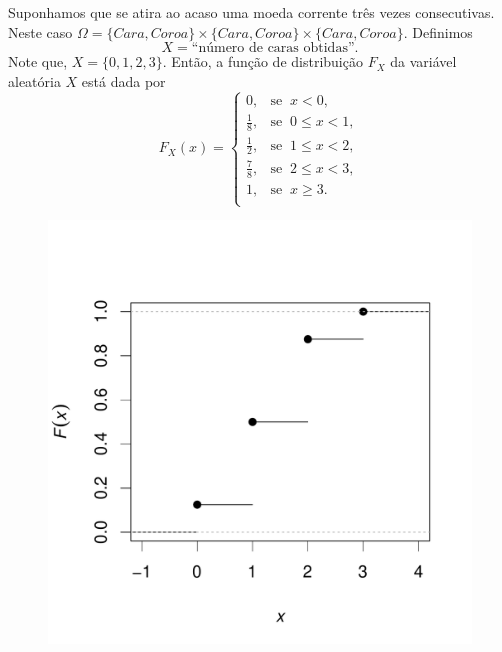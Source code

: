 \begin{frame}

\begin{exem}
	Suponhamos que se atira ao acaso uma moeda corrente três vezes consecutivas. Neste caso $\Omega =\{Cara, Coroa\} \times \{Cara, Coroa\} \times \{Cara, Coroa\}.$ Definimos 
	$$X= \text{``n\'{u}mero de caras obtidas''}.$$ Note que, $X=\{0, 1, 2, 3 \}.$ Então, a função de distribuição $F_{X}$ da variável aleatória $X$ está dada por
	$$
	F_{X}(x)=\begin{cases}
	0, & \text{se } \ x<0, \\
	\frac{1}{8}, &\text{se } \ 0\leq x<1, \\
	\frac{1}{2}, &\text{se } \ 1\leq x<2, \\
	\frac{7}{8}, & \text{se } \ 2\leq x<3, \\
	1, & \text{se } \ x\geq 3.\\
	\end{cases}
	$$
	\vspace{-1.2cm}
\begin{figure}[!htb]
	\begin{center}
		\includegraphics[scale=0.25]{fig11a.pdf}
	\end{center}
\end{figure}
\end{exem}
\end{frame}



